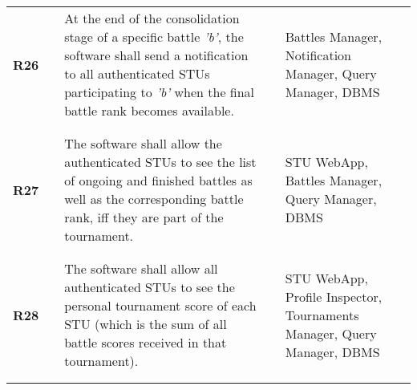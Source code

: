 \begin{longtable}[H]{l l p{6cm} l p{4cm}}
    \textbf{R26}            & \vline & At the end of the consolidation stage of a specific battle \textit{'b'}, the software shall send a notification to all authenticated STUs participating to \textit{'b'} when the final battle rank becomes available.                                                        & \vline &  Battles Manager, Notification Manager, Query Manager, DBMS                              \\          
                            &        &                                                                                                                                                                                                                                                                              &        &                                                                                          \\\hline & & \\ 
    \textbf{R27}            & \vline & The software shall allow the authenticated STUs to see the list of ongoing and finished battles as well as the corresponding battle rank, iff they are part of the tournament.                                                                                               & \vline &  STU WebApp, Battles Manager, Query Manager, DBMS                                        \\          
                            &        &                                                                                                                                                                                                                                                                              &        &                                                                                          \\\hline & & \\ 
    \textbf{R28}            & \vline & The software shall allow all authenticated STUs to see the personal tournament score of each STU (which is the sum of all battle scores received in that tournament).                                                                                                        & \vline &  STU WebApp, Profile Inspector, Tournaments Manager, Query Manager, DBMS                 \\          
                            &        &                                                                                                                                                                                                                                                                              &        &                                                                                          \\\hline & & \\ 

\end{longtable}
